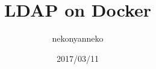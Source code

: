 \begin{titlepage}
\title{LDAP on Docker}
\date{2017/03/11}
\author{nekonyanneko}
\maketitle
\thispagestyle{empty}
\end{titlepage}